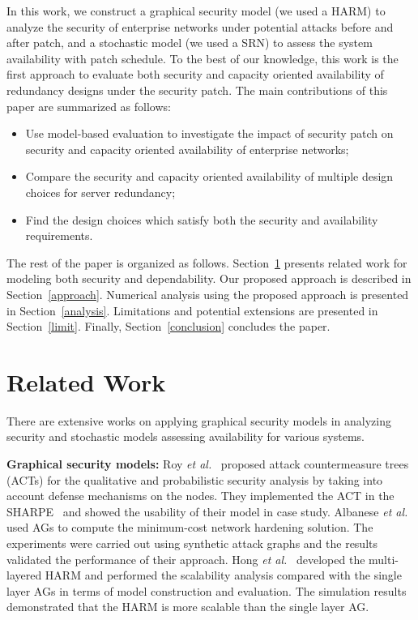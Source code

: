 \documentclass[conference]{IEEEtran}
\begin{document}
In this work, we construct a graphical security model (we used a HARM) to analyze the security of enterprise networks under potential attacks before and after patch, and a stochastic model (we used a SRN) to assess the system availability with patch schedule. To the best of our knowledge, this work is the first approach to evaluate both security and capacity oriented availability of redundancy designs under the security patch. The main contributions of this paper are summarized as follows:
\begin{itemize}
\item Use model-based evaluation to investigate the impact of security patch on security and capacity oriented availability of enterprise networks; 
\item Compare the security and capacity oriented availability of multiple design choices for server redundancy;
\item Find the design choices which satisfy both the security and availability requirements.
\end{itemize}

The rest of the paper is organized as follows. Section~\ref{relatedwork} presents related work for modeling both security and dependability. Our proposed approach is described in Section~\ref{approach}. Numerical analysis using the proposed approach is presented in Section~\ref{analysis}. Limitations and potential extensions are presented in Section~\ref{limit}. Finally, Section~\ref{conclusion} concludes the paper.

\section{Related Work}
\label{relatedwork}

There are extensive works on applying graphical security models in analyzing security and stochastic models assessing availability for various systems. 

\textbf{Graphical security models:} Roy \emph{et al.}~\cite{Roy2011SECN} proposed attack countermeasure trees (ACTs) for the qualitative and probabilistic security analysis by taking into account defense mechanisms on the nodes. They implemented the ACT in the SHARPE~\cite{Trived2009SHARPE} and showed the usability of their model in case study. Albanese \emph{et al.}~\cite{Albanese2012DSN} used AGs to compute the minimum-cost network hardening solution. The experiments were carried out using synthetic attack graphs and the results validated the performance of their approach. Hong \emph{et al.}~\cite{Hong2016JNCA} developed the multi-layered HARM and performed the scalability analysis compared with the single layer AGs in terms of model construction and evaluation. The simulation results demonstrated that the HARM is more scalable than the single layer AG.
\end{document}
